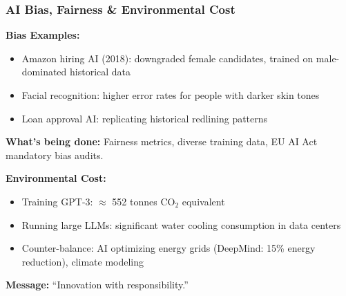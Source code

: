 \begin{frame}[fragile]\frametitle{AI Bias, Fairness \& Environmental Cost}
\textbf{Bias Examples:}
\begin{itemize}
\item Amazon hiring AI (2018): downgraded female candidates, trained on male-dominated historical data
\item Facial recognition: higher error rates for people with darker skin tones
\item Loan approval AI: replicating historical redlining patterns
\end{itemize}

\textbf{What's being done:} Fairness metrics, diverse training data, EU AI Act mandatory bias audits.

\vspace{0.5em}
\textbf{Environmental Cost:}
\begin{itemize}
\item Training GPT-3: $\approx$ 552 tonnes $\text{CO}_2$ equivalent
\item Running large LLMs: significant water cooling consumption in data centers
\item Counter-balance: AI optimizing energy grids (DeepMind: 15\% energy reduction), climate modeling
\end{itemize}
\textbf{Message:} ``Innovation with responsibility.''
\end{frame}


